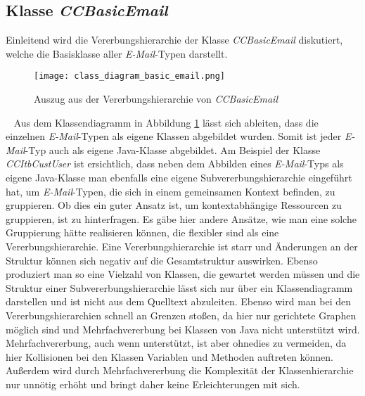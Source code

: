 \subsection{Klasse \emph{CCBasicEmail}}
\label{sec:implementierung-ccbasic-mail}
Einleitend wird die Vererbungshierarchie der Klasse \emph{CCBasicEmail} diskutiert, welche die Basisklasse aller \emph{E-Mail}-Typen darstellt.
\begin{figure}[h]
\centering
\texttt{[image: class\_diagram\_basic\_email.png]} 
\caption{Auszug aus der Vererbungshierarchie von \emph{CCBasicEmail}}
\label{fig:klassen-hierarchie-ccbasicemail}
\end{figure}
\ \newline
Aus dem Klassendiagramm in Abbildung \ref{fig:klassen-hierarchie-ccbasicemail} lässt sich ableiten, dass die einzelnen \emph{E-Mail}-Typen als eigene Klassen abgebildet wurden. Somit ist jeder \emph{E-Mail}-Typ auch als eigene Java-Klasse abgebildet. 
\newline
\newline
Am Beispiel der Klasse \emph{CCItbCustUser} ist ersichtlich, dass neben dem Abbilden eines \emph{E-Mail}-Typs als eigene Java-Klasse man ebenfalls eine eigene Subvererbungshierarchie eingeführt hat, um \emph{E-Mail}-Typen, die sich in einem gemeinsamen Kontext befinden, zu gruppieren. Ob dies ein guter Ansatz ist, um kontextabhängige Ressourcen zu gruppieren, ist zu hinterfragen. Es gäbe hier andere Ansätze, wie man eine solche Gruppierung hätte realisieren können, die flexibler sind als eine Vererbungshierarchie. Eine Vererbungshierarchie ist starr und Änderungen an der Struktur können sich negativ auf die Gesamtstruktur auswirken. Ebenso produziert man so eine Vielzahl von Klassen, die gewartet werden müssen und die Struktur einer Subvererbungshierarchie lässt sich nur über ein Klassendiagramm darstellen und ist nicht aus dem Quelltext abzuleiten. Ebenso wird man bei den Vererbungshierarchien schnell an Grenzen stoßen, da hier nur gerichtete Graphen möglich sind und Mehrfachvererbung bei Klassen von Java nicht unterstützt wird. 
\newline
\newline
Mehrfachvererbung, auch wenn unterstützt, ist aber ohnedies zu vermeiden, da hier Kollisionen bei den Klassen Variablen und Methoden auftreten können. Außerdem wird durch Mehrfachvererbung die Komplexität der Klassenhierarchie nur unnötig erhöht und bringt daher keine Erleichterungen mit sich.

